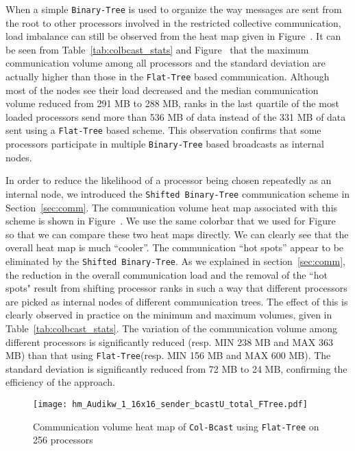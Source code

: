 \documentclass{acm_proc_article-sp}
\newcommand{\colbcast}{\texttt{Col-Bcast}\xspace}
\newcommand{\flattree}{\texttt{Flat-Tree}\xspace}
\newcommand{\btree}{\texttt{Binary-Tree}\xspace}
\newcommand{\modbtree}{\texttt{Shifted Binary-Tree}\xspace}
\begin{document}
When a simple \btree is used to organize the way messages are sent
from the root to other processors involved in the restricted collective
communication, load imbalance can still be observed from the heat map 
given in Figure~. It can be seen from 
Table~\ref{tab:colbcast_stats} and Figure~ that the maximum communication volume among all processors and 
the standard deviation are actually higher than those in the \flattree based
communication. Although
most of the nodes see their load decreased and the median communication
volume reduced from 291 MB to 288 MB, ranks in the last quartile of the most loaded processors
send more than 536 MB of data instead of the 331 MB of data sent using a
\flattree based scheme.  This observation confirms that some processors
participate in multiple \btree based broadcasts as internal nodes.









In order to reduce the likelihood of a processor being chosen repeatedly 
as an internal node, we introduced the \modbtree communication
scheme in Section~\ref{sec:comm}. The communication volume heat map 
associated with this scheme is shown in 
Figure~. 
We use the same colorbar that we used for 
Figure~ so that we can compare these 
two heat maps directly.  We can clearly see that the overall heat map 
is much ``cooler''.  The communication ``hot spots'' appear to be
eliminated by the \modbtree.
As we explained in section~\ref{sec:comm}, the reduction in 
the overall communication load and the removal of the ``hot spots" 
result from shifting processor ranks in such a way that
different processors are picked as internal nodes of different
communication trees. The effect of this is clearly observed in practice
on the minimum and maximum volumes, given in
Table~\ref{tab:colbcast_stats}.  The variation of the communication
volume among different processors is significantly reduced (resp. MIN
238 MB and MAX 363 MB) than that using \flattree (resp. MIN 156 MB and
MAX 600 MB). The standard deviation is significantly reduced from 72 MB
to 24 MB, confirming the efficiency of the approach.



\begin{figure}[htbp]
\centering
\begin{adjustbox}{width=.50\linewidth}
  \texttt{[image: hm\_Audikw\_1\_16x16\_sender\_bcastU\_total\_FTree.pdf]}
\end{adjustbox}
\caption{Communication volume heat map of \colbcast using \flattree on 256 processors}
\label{fig:hm_sender_bcastU_ftree_16x16}
\end{figure}
\end{document}
